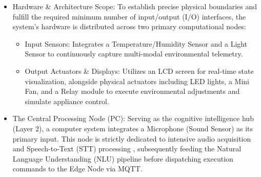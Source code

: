 \begin{itemize}
    \item Hardware \& Architecture Scope: To establish precise physical boundaries and fulfill the required minimum number of input/output (I/O) interfaces, the system's hardware is distributed across two primary computational nodes:
    \begin{itemize}
        \item Input Sensors: Integrates a Temperature/Humidity Sensor and a Light Sensor to continuously capture multi-modal environmental telemetry.
        \item Output Actuators \& Displays: Utilizes an LCD screen for real-time state visualization, alongside physical actuators including LED lights, a Mini Fan, and a Relay module to execute environmental adjustments and simulate appliance control.
    \end{itemize}

    \item The Central Processing Node (PC): Serving as the cognitive intelligence hub (Layer 2), a computer system integrates a Microphone (Sound Sensor) as its primary input. This node is strictly dedicated to intensive audio acquisition and Speech-to-Text (STT) processing , subsequently feeding the Natural Language Understanding (NLU) pipeline before dispatching execution commands to the Edge Node via MQTT. 
\end{itemize}